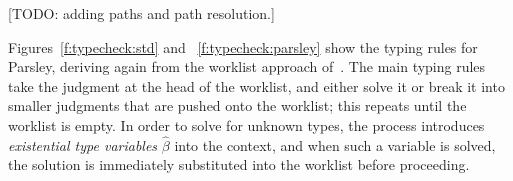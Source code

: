 \documentclass[letterpaper]{article}
\newcommand{\todo}[1]{{\color{red}[TODO: #1]}}
\newcommand{\etv}{\widehat{\beta}}    %
\begin{document}
\todo{adding paths and path resolution.}

Figures~\ref{f:typecheck:std} and ~\ref{f:typecheck:parsley} show the
typing rules for Parsley, deriving again from the worklist approach
of~\cite{zhao2018,zhao19:bidir}.  The main typing rules take the
judgment at the head of the worklist, and either solve it or break it
into smaller judgments that are pushed onto the worklist; this repeats
until the worklist is empty.  In order to solve for unknown types, the
process introduces {\em existential type variables} $\etv$ into the
context, and when such a variable is solved, the solution is
immediately substituted into the worklist before proceeding.

\newcommand\rstep[1]{~\longrightarrow_{\makebox[0pt][l]{$\scriptstyle #1$}\phantom{~~}}}
\newcommand\typrule{\stepcounter{ruleCounter}\rstep{\arabic{ruleCounter}}}
\end{document}
